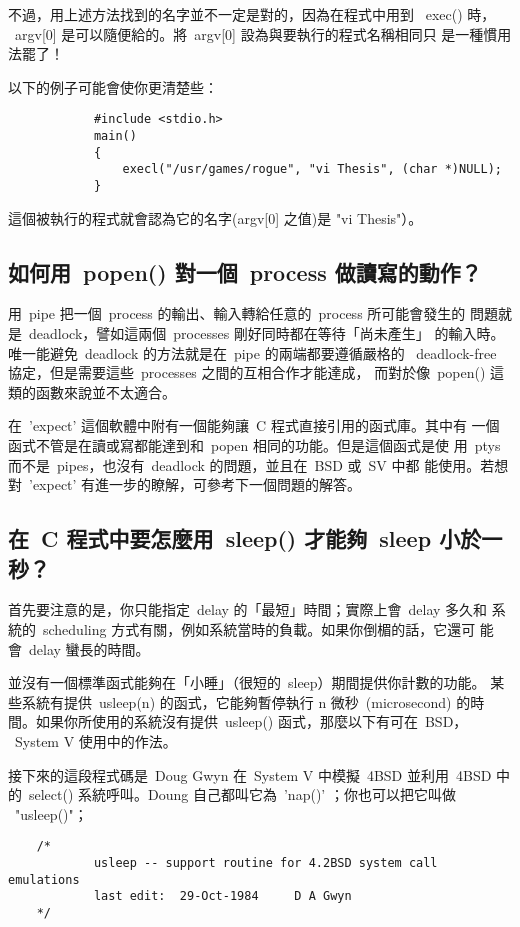 \documentclass{article}
\begin{document}
\begin{CJK*}{Bg5}{ming}
	不過，用上述方法找到的名字並不一定是對的，因為在程式中用到
	~exec() 時， 
        ~argv[0] 是可以隨便給的。將~argv[0] 設為與要執行的程式名稱相同只
	是一種慣用法罷了！

	以下的例子可能會使你更清楚些：
\small
\begin{verbatim} 
	        #include <stdio.h>
        	main()
	        {
        	    execl("/usr/games/rogue", "vi Thesis", (char *)NULL);
	        }
\end{verbatim} 
\normalsize
	這個被執行的程式就會認為它的名字(argv[0] 之值)是 "vi Thesis"）。

\subsection{如何用~popen() 對一個~process 做讀寫的動作？}

	用~pipe 把一個~process 的輸出、輸入轉給任意的~process 所可能會發生的
        問題就是~deadlock，譬如這兩個~processes 剛好同時都在等待「尚未產生」
        的輸入時。唯一能避免~deadlock 的方法就是在~pipe 的兩端都要遵循嚴格的
	~deadlock-free 協定，但是需要這些~processes 之間的互相合作才能達成，
        而對於像~popen() 這類的函數來說並不太適合。

	在~'expect' 這個軟體中附有一個能夠讓~C 程式直接引用的函式庫。其中有
        一個函式不管是在讀或寫都能達到和~popen 相同的功能。但是這個函式是使
        用~ptys 而不是~pipes，也沒有~deadlock 的問題，並且在~BSD 或~SV 中都
        能使用。若想對~'expect' 有進一步的瞭解，可參考下一個問題的解答。

\subsection{在~C 程式中要怎麼用~sleep() 才能夠~sleep 小於一秒？}

	首先要注意的是，你只能指定~delay 的「最短」時間；實際上會~delay 多久和
	系統的~scheduling 方式有關，例如系統當時的負載。如果你倒楣的話，它還可
	能會~delay 蠻長的時間。

	並沒有一個標準函式能夠在「小睡」（很短的~sleep）期間提供你計數的功能。
	某些系統有提供~usleep(n) 的函式，它能夠暫停執行 n 微秒~(microsecond)
        的時間。如果你所使用的系統沒有提供~usleep() 函式，那麼以下有可在~BSD，
	~System V 使用中的作法。

	接下來的這段程式碼是~Doug Gwyn 在~System V 中模擬~4BSD 並利用~4BSD 
	中的~select() 系統呼叫。Doung 自己都叫它為~'nap()' ；你也可以把它叫做 
	~"usleep()"；
\footnotesize
\begin{verbatim}
	/*
            usleep -- support routine for 4.2BSD system call emulations
            last edit:  29-Oct-1984     D A Gwyn
	*/


\end{verbatim}
\end{CJK*}
\end{document}
